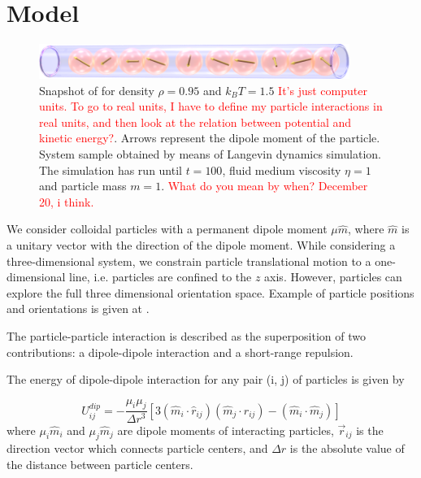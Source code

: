 \section{Model}
\label{sec:model}

\begin{figure}[t]
\centering
	\includegraphics[width=0.9\textwidth]{Images/fullSystemPicture}
	\captionsetup{justification=centering, width=0.9\textwidth}
	\caption{Snapshot of for density $\rho = 0.95$ and $k_BT = 1.5$ \textcolor{red}{It's just computer units. To go to real units, I have to define my particle interactions in real units, and then look at the relation between potential and kinetic energy?}. Arrows represent the dipole moment of the particle. System sample obtained by means of Langevin dynamics simulation. The simulation has run until $t = 100$, fluid medium viscosity $\eta = 1$ and particle mass $m = 1$. \textcolor{red}{What do you mean by when? December 20, i think.}}
	\label{fig:fullSystemPicture}
\end{figure}

We consider colloidal particles with a permanent dipole moment $\mu \hat{m}$, where $\hat{m}$ is a unitary vector with the direction of the dipole moment. While considering a three-dimensional system, we constrain particle translational motion to a one-dimensional line, i.e. particles are confined to the $z$ axis. However, particles can explore the full three dimensional orientation space. Example of particle positions and orientations is given at .

The particle-particle interaction is described as the superposition of two contributions: a dipole-dipole interaction and a short-range repulsion.

The energy of dipole-dipole interaction for any pair (i, j) of particles is given by

\begin{equation}
\label{eq:dipole_dipole_interaction}
U^{dip}_{ij} =
	- \frac{\mu_i \mu_j}{\Delta r^3}[
		3 (\hat{m}_i \cdot \hat{r}_{ij})(\hat{m}_j \cdot \hat{r}_{ij})
		- (\hat{m}_i \cdot \hat{m}_j)
	]
\end{equation}
where $\mu_i \hat{m}_i$ and $\mu_j \hat{m}_j$ are dipole moments of interacting particles, $\vec{r}_{ij}$ is the direction vector which connects particle centers, and $\Delta r$ is the absolute value of the distance between particle centers.

